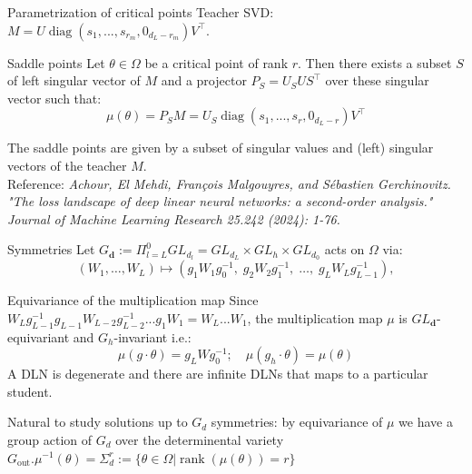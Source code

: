 \documentclass[aspectratio=169,11pt]{beamer}
\begin{document}
\begin{frame}{Parametrization of critical points}
Teacher SVD: \(M=U\operatorname{diag}(s_1,...,s_{r_m},0_{d_L-r_m})V^{\top}\).
\begin{block}{Saddle points}
    Let $\theta\in\Omega$ be a critical point of rank $r$. Then there exists a subset $S$ of left singular vector of $M$ and a projector $P_S=U_SUS^{\top}$ over these singular vector such that:
    \[
    \mu(\theta) = P_SM = U_S\operatorname{diag}(s_1,...,s_{r},0_{d_L-r})V^{\top}
    \]
\end{block}
The saddle points are given by a subset of singular values and (left) singular vectors of the teacher $M$.
\\
Reference: \textit{Achour, El Mehdi, François Malgouyres, and Sébastien Gerchinovitz. "The loss landscape of deep linear neural networks: a second-order analysis." Journal of Machine Learning Research 25.242 (2024): 1-76.}
\end{frame}
\begin{frame}{Symmetries}
Let $G_{\textbf{d}}:=\Pi_{l=L}^0 GL_{d_l} = GL_{d_L}\times GL_{h} \times GL_{d_0}$ acts on $\Omega$ via:
\[
(W_1,\dots,W_L)\mapsto (g_1W_1g_0^{-1},\; g_2W_2g_1^{-1},\;\dots,\; g_L W_L g_{L-1}^{-1}),
\]
\begin{block}{Equivariance of the multiplication map}
    Since \(W_Lg_{L-1}^{-1}g_{L-1}W_{L-2}g_{L-2}^{-1}...g_1W_1=W_L...W_1\), the multiplication map $\mu$ is $GL_{\textbf{d}}$-equivariant and $G_h$-invariant i.e.: $$\mu(g\cdot \theta)=g_LWg_0^{-1};\quad \mu(g_h\cdot \theta) = \mu(\theta) $$
A DLN is degenerate and there are infinite DLNs that maps to a particular student.
\end{block}
Natural to study solutions up to $G_d$ symmetries: by equivariance of $\mu$ we have a group action of $G_d$ over the determinental variety $G_{\text{out}}.\mu^{-1}(\theta)=\Sigma_d^{r}:=\{\theta\in \Omega|\operatorname{rank}(\mu(\theta)) = r\}$    
\end{frame}

\end{document}
